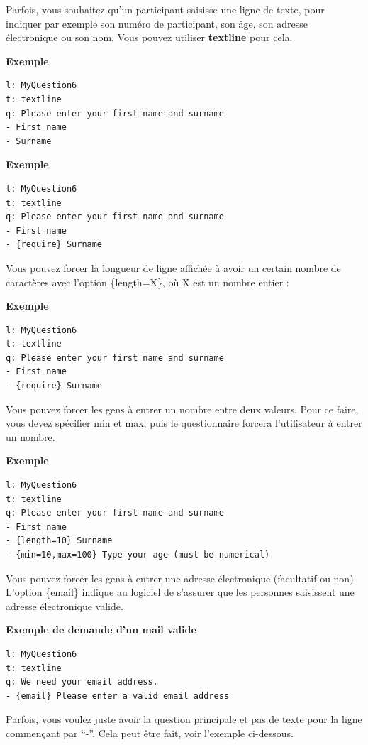 \documentclass[
]{book}
\begin{document}
Parfois, vous souhaitez qu'un participant saisisse une ligne de texte, pour indiquer par exemple son numéro de participant, son âge, son adresse électronique ou son nom. Vous pouvez utiliser \textbf{textline} pour cela.

\textbf{Exemple}

\begin{verbatim}
l: MyQuestion6
t: textline
q: Please enter your first name and surname
- First name
- Surname
\end{verbatim}

\textbf{Exemple}

\begin{verbatim}
l: MyQuestion6
t: textline
q: Please enter your first name and surname
- First name
- {require} Surname
\end{verbatim}

Vous pouvez forcer la longueur de ligne affichée à avoir un certain nombre de caractères avec l'option \{length=X\}, où X est un nombre entier :

\textbf{Exemple}

\begin{verbatim}
l: MyQuestion6
t: textline
q: Please enter your first name and surname
- First name
- {require} Surname
\end{verbatim}

Vous pouvez forcer les gens à entrer un nombre entre deux valeurs. Pour ce faire, vous devez spécifier min et max, puis le questionnaire forcera l'utilisateur à entrer un nombre.

\textbf{Exemple}

\begin{verbatim}
l: MyQuestion6
t: textline
q: Please enter your first name and surname
- First name
- {length=10} Surname
- {min=10,max=100} Type your age (must be numerical)
\end{verbatim}

Vous pouvez forcer les gens à entrer une adresse électronique (facultatif ou non). L'option \{email\} indique au logiciel de s'assurer que les personnes saisissent une adresse électronique valide.

\textbf{Exemple de demande d'un mail valide}

\begin{verbatim}
l: MyQuestion6
t: textline
q: We need your email address.
- {email} Please enter a valid email address
\end{verbatim}

Parfois, vous voulez juste avoir la question principale et pas de texte pour la ligne commençant par ``-''. Cela peut être fait, voir l'exemple ci-dessous.
\end{document}
